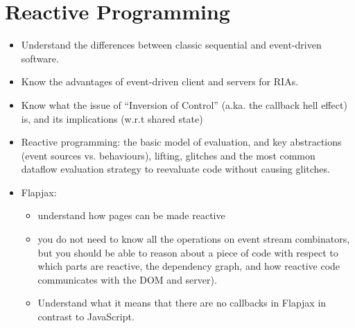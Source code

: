 \documentclass[a4paper]{report}
\begin{document}
\chapter{Reactive Programming}
\begin{itemize}
\item Understand the differences between classic sequential and event-driven software.
\item Know the advantages of event-driven client and servers for RIAs.
\item Know what the issue of “Inversion of Control” (a.ka. the callback hell effect) is, and its
implications (w.r.t shared state)
\item Reactive programming: the basic model of evaluation, and key abstractions (event
sources vs. behaviours), lifting, glitches and the most common dataflow evaluation
strategy to reevaluate code without causing glitches.
\item Flapjax:
\begin{itemize}
\item understand how pages can be made reactive
\item you do not need to know all the operations on event stream combinators, but you
should be able to reason about a piece of code with respect to which parts are
reactive, the dependency graph, and how reactive code communicates with the
DOM and server).
\item Understand what it means that there are no callbacks in Flapjax in contrast to
JavaScript.
\end{itemize}
\end{itemize}
\end{document}
